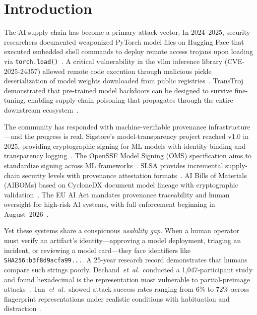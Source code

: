 \documentclass[conference,10pt]{IEEEtran}
\newcommand{\etal}{\textit{et~al.}}
\begin{document}
\section{Introduction}
\label{sec:intro}

The AI supply chain has become a primary attack vector.
In 2024--2025, security researchers documented weaponized PyTorch model files on Hugging Face that executed embedded shell commands to deploy remote access trojans upon loading via \texttt{torch.load()}~\cite{cso2025pickle,rapid72025pickle}.
A critical vulnerability in the vllm inference library (CVE-2025-24357) allowed remote code execution through malicious pickle deserialization of model weights downloaded from public registries~\cite{vllm2025cve}.
TransTroj demonstrated that pre-trained model backdoors can be designed to survive fine-tuning, enabling supply-chain poisoning that propagates through the entire downstream ecosystem~\cite{transtroj2025www}.

The community has responded with machine-verifiable provenance infrastructure---and the progress is real.
Sigstore's model-transparency project reached v1.0 in 2025, providing cryptographic signing for ML models with identity binding and transparency logging~\cite{sigstore2025model}.
The OpenSSF Model Signing (OMS) specification aims to standardize signing across ML frameworks~\cite{openssf2025oms}.
SLSA provides incremental supply-chain security levels with provenance attestation formats~\cite{slsa2023spec}.
AI Bills of Materials (AIBOMs) based on CycloneDX document model lineage with cryptographic validation~\cite{aibom2026frontiers,owasp2025aibom}.
The EU AI Act mandates provenance traceability and human oversight for high-risk AI systems, with full enforcement beginning in August~2026~\cite{euaiact2024}.

Yet these systems share a conspicuous \emph{usability gap}.
When a human operator must verify an artifact's identity---approving a model deployment, triaging an incident, or reviewing a model card---they face identifiers like \texttt{SHA256:b3f8d9ac\-fa99...}.
A 25-year research record demonstrates that humans compare such strings poorly.
Dechand~\etal~conducted a 1,047-participant study and found hexadecimal is the representation most vulnerable to partial-preimage attacks~\cite{dechand2016empirical}.
Tan~\etal~showed attack success rates ranging from 6\% to 72\% across fingerprint representations under realistic conditions with habituation and distraction~\cite{tan2017unicorns}.
\end{document}
